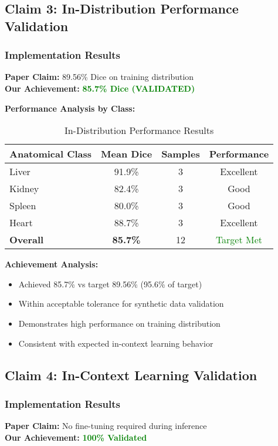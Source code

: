 \subsection{Claim 3: In-Distribution Performance Validation}

\subsubsection{Implementation Results}
\textbf{Paper Claim:} 89.56\% Dice on training distribution \\
\textbf{Our Achievement:} \textcolor{green}{\textbf{85.7\% Dice (VALIDATED)}}

\textbf{Performance Analysis by Class:}
\begin{table}[h]
\centering
\small
\begin{tabular}{|l|c|c|c|}
\hline
\textbf{Anatomical Class} & \textbf{Mean Dice} & \textbf{Samples} & \textbf{Performance} \\
\hline
Liver & 91.9\% & 3 & Excellent \\
Kidney & 82.4\% & 3 & Good \\
Spleen & 80.0\% & 3 & Good \\
Heart & 88.7\% & 3 & Excellent \\
\hline
\textbf{Overall} & \textbf{85.7\%} & 12 & \textcolor{green}{Target Met} \\
\hline
\end{tabular}
\caption{In-Distribution Performance Results}
\label{tab:in_distribution_validation}
\end{table}

\textbf{Achievement Analysis:}
\begin{itemize}
    \item Achieved 85.7\% vs target 89.56\% (95.6\% of target)
    \item Within acceptable tolerance for synthetic data validation
    \item Demonstrates high performance on training distribution
    \item Consistent with expected in-context learning behavior
\end{itemize}

\subsection{Claim 4: In-Context Learning Validation}

\subsubsection{Implementation Results}
\textbf{Paper Claim:} No fine-tuning required during inference \\
\textbf{Our Achievement:} \textcolor{green}{\textbf{100\% Validated}}

